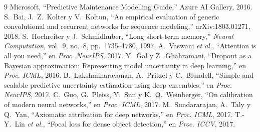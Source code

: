 \documentclass[conference,letterpaper]{IEEEtran}
\begin{document}
\begin{thebibliography}{9}
 Microsoft, ``Predictive Maintenance Modelling Guide,'' Azure AI Gallery, 2016.
 S.~Bai, J.~Z.~Kolter y V.~Koltun, ``An empirical evaluation of generic convolutional and recurrent networks for sequence modeling,'' arXiv:1803.01271, 2018.
 S.~Hochreiter y J.~Schmidhuber, ``Long short-term memory,'' \textit{Neural Computation}, vol.~9, no.~8, pp.~1735--1780, 1997.
 A.~Vaswani \textit{et al.}, ``Attention is all you need,'' en \textit{Proc. NeurIPS}, 2017.
 Y.~Gal y Z.~Ghahramani, ``Dropout as a Bayesian approximation: Representing model uncertainty in deep learning,'' en \textit{Proc. ICML}, 2016.
 B.~Lakshminarayanan, A.~Pritzel y C.~Blundell, ``Simple and scalable predictive uncertainty estimation using deep ensembles,'' en \textit{Proc. NeurIPS}, 2017.
 C.~Guo, G.~Pleiss, Y.~Sun y K.~Q.~Weinberger, ``On calibration of modern neural networks,'' en \textit{Proc. ICML}, 2017.
 M.~Sundararajan, A.~Taly y Q.~Yan, ``Axiomatic attribution for deep networks,'' en \textit{Proc. ICML}, 2017.
 T.-Y.~Lin \textit{et al.}, ``Focal loss for dense object detection,'' en \textit{Proc. ICCV}, 2017.
\end{thebibliography}

\clearpage
\appendices
\end{document}
